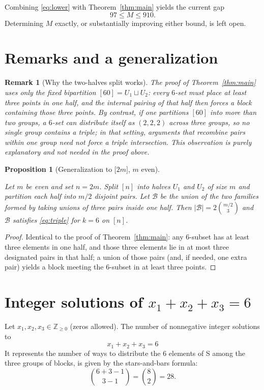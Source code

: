 \documentclass[11pt]{article}
\newtheorem{proposition}{Proposition}
\newtheorem{remark}{Remark}
\begin{document}
Combining \eqref{eq:lower} with Theorem~\ref{thm:main} yields the current gap
\[
97 \le M \le 910.
\]
Determining $M$ exactly, or substantially improving either bound, is left open.


\section{Remarks and a generalization}

\begin{remark}[Why the two-halves split works]
The proof of Theorem~\ref{thm:main} uses only the fixed bipartition $[60]=U_1\sqcup U_2$:
every $6$-set must place at least three points in one half, and the internal pairing of that half
then forces a block containing those three points.
By contrast, if one partitions $[60]$ into more than two groups, a $6$-set can distribute itself
as $(2,2,2)$ across three groups, so no single group contains a triple; in that setting,
arguments that recombine pairs \emph{within one group} need not force a triple intersection.
This observation is purely explanatory and not needed in the proof above.
\end{remark}

\begin{proposition}[Generalization to $\lbrack 2m\rbrack$, $m$ even]\label{prop:general}

Let $m$ be even and set $n=2m$.
Split $[n]$ into halves $U_1$ and $U_2$ of size $m$ and partition each half into $m/2$ disjoint pairs.
Let $\mathcal{B}$ be the union of the two families formed by taking unions of three pairs inside one half.
Then $|\mathcal{B}|=2\binom{m/2}{3}$ and $\mathcal{B}$ satisfies \eqref{eq:triple} for $k=6$ on $[n]$.
\end{proposition}

\begin{proof}
Identical to the proof of Theorem~\ref{thm:main}: any $6$-subset has at least three elements in one half,
and those three elements lie in at most three designated pairs in that half; a union of those pairs
(and, if needed, one extra pair) yields a block meeting the $6$-subset in at least three points.
\end{proof}
\section{Integer solutions of $x_1+x_2+x_3=6$}
\label{sec:solutions-x123}

Let $x_1,x_2,x_3\in\mathbb{Z}_{\ge 0}$ (zeros allowed). The number of nonnegative integer
solutions to
\[
x_1+x_2+x_3=6
\]
 It represents the number of ways to distribute the 6 elements of 
S among the three groups of blocks, is given by the stars-and-bars formula:
\[
\binom{6+3-1}{3-1}=\binom{8}{2}=28.
\]
\end{document}
